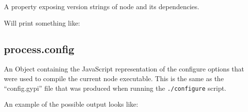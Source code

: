 A property exposing version strings of node and its dependencies.

\begin{Shaded}
\begin{Highlighting}[]
\NormalTok{(}\NormalTok{);}
\end{Highlighting}
\end{Shaded}

Will print something like:

\begin{Shaded}
\begin{Highlighting}[]
\NormalTok{\{ }\NormalTok{: }\NormalTok{,}
  \NormalTok{: }\NormalTok{,}
  \NormalTok{: }\NormalTok{,}
  \NormalTok{: }\NormalTok{,}
  \NormalTok{: }\NormalTok{,}
  \NormalTok{: }\NormalTok{,}
  \NormalTok{: }\NormalTok{,}
  \NormalTok{: } \NormalTok{\}}
\end{Highlighting}
\end{Shaded}

\subsection{process.config}\label{process.config}

An Object containing the JavaScript representation of the configure
options that were used to compile the current node executable. This is
the same as the ``config.gypi'' file that was produced when running the
\texttt{./configure} script.

An example of the possible output looks like:

